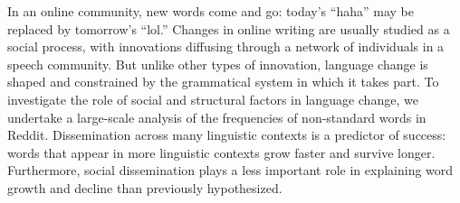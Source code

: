 In an online community, new words come and go: today's ``haha'' may be replaced by tomorrow's ``lol.'' Changes in online writing are usually studied as a social process, with innovations diffusing through a network of individuals in a speech community. But unlike other types of innovation, language change is shaped and constrained by the grammatical system in which it takes part. To investigate the role of social and structural factors in language change, we undertake a large-scale analysis of the frequencies of non-standard words in Reddit. Dissemination across many linguistic contexts is a predictor of success: words that appear in more linguistic contexts grow faster and survive longer. Furthermore, social dissemination plays a less important role in explaining word growth and decline than previously hypothesized.
